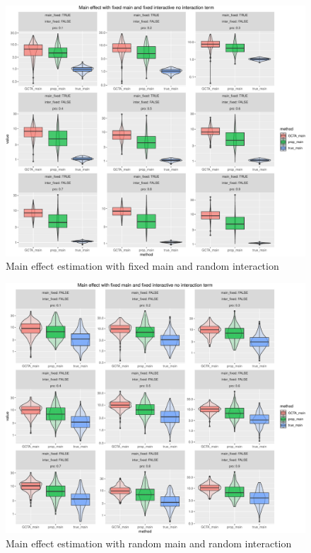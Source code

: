 \documentclass[]{article}
\begin{document}
\begin{figure}
\centering
\includegraphics{Simulation_report_files/figure-latex/main effect fixed random without inter-1.pdf}
\caption{Main effect estimation with fixed main and random interaction}
\end{figure}

\begin{figure}
\centering
\includegraphics{Simulation_report_files/figure-latex/main effect random random without inter-1.pdf}
\caption{Main effect estimation with random main and random interaction}
\end{figure}
\end{document}
